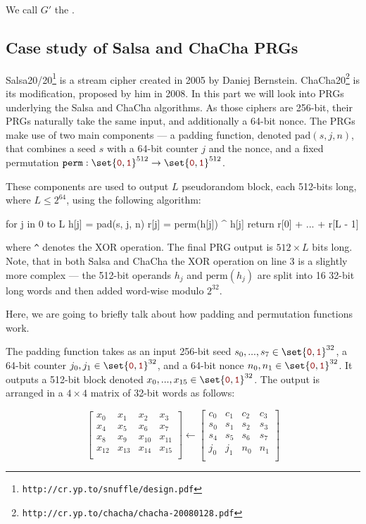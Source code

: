 \documentclass[a4paper,10pt]{article}
\newcommand{\mtt}[1]{{\color{darkred} \mathtt{#1}}}
\newenvironment{code}{\list{}{\rightmargin\leftmargin}\item\relax\endgraf\verbatim}{\endverbatim\endlist}
\begin{document}
We call $G'$ the .

\subsection{Case study of Salsa and ChaCha PRGs}
Salsa20/20\footnote{\verb|http://cr.yp.to/snuffle/design.pdf|} is a stream
cipher created in 2005 by Daniej Bernstein. ChaCha20\footnote{\verb|http://cr.yp.to/chacha/chacha-20080128.pdf|}
is its modification, proposed by him in 2008. In this part we will look into
PRGs underlying the Salsa and ChaCha algorithms. As those ciphers are 256-bit,
their PRGs naturally take the same input, and additionally a 64-bit nonce. The
PRGs make use of two main components --- a padding function, denoted $\text{pad}(s,j,n)$,
that combines a seed $s$ with a 64-bit counter $j$ and the nonce, and a fixed
permutation $\mathtt{perm} :  \set{\mtt{0},\mtt{1}}^{512} \to \set{\mtt{0},\mtt{1}}^{512}$.

These components are used to output $L$ pseudorandom block, each 512-bits long,
where $L \le 2^{64}$, using the following algorithm:

\begin{code}
for j in 0 to L
  h[j] = pad(s, j, n)
  r[j] = perm(h[j]) ^ h[j]
return r[0] + ... + r[L - 1]
\end{code}

where \verb|^| denotes the XOR operation. The final PRG output is $512 \times L$
bits long. Note, that in both Salsa and ChaCha the XOR operation on line 3 is a
slightly more complex --- the 512-bit operands $h_j$ and $\text{perm}(h_j)$ are
split into 16 32-bit long words and then added word-wise modulo $2^{32}$.

Here, we are going to briefly talk about how padding and permutation functions
work.

The padding function takes as an input 256-bit seed $s_0, ..., s_7 \in \set{\mtt{0},\mtt{1}}^{32}$,
a 64-bit counter $j_0, j_1 \in \set{\mtt{0},\mtt{1}}^{32}$, and a 64-bit nonce
$n_0, n_1 \in \set{\mtt{0},\mtt{1}}^{32}$. It outputs a 512-bit block denoted
$x_0, ..., x_{15} \in \set{\mtt{0},\mtt{1}}^{32}$. The output is arranged in a
$4 \times 4$ matrix of 32-bit words as follows:

\[
  \begin{bmatrix}
    x_0 & x_1 & x_2 & x_3 \\
    x_4 & x_5 & x_6 & x_7 \\
    x_8 & x_9 & x_{10} & x_{11} \\
    x_{12} & x_{13} & x_{14} & x_{15} \\
  \end{bmatrix} \leftarrow \begin{bmatrix}
    c_0 & c_1 & c_2 & c_3 \\
    s_0 & s_1 & s_2 & s_3 \\
    s_4 & s_5 & s_6 & s_7 \\
    j_0 & j_1 & n_0 & n_1 \\
  \end{bmatrix}
\]
\end{document}
